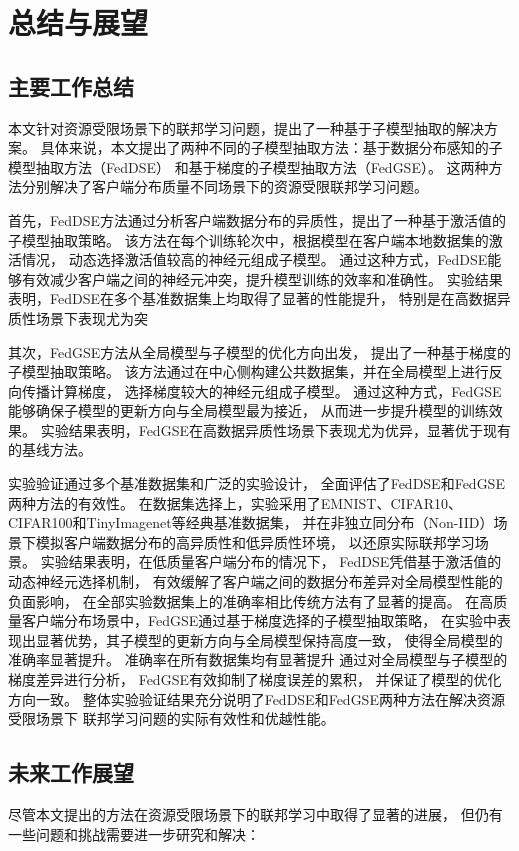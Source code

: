 \chapter{总结与展望}

\section{主要工作总结}
本文针对资源受限场景下的联邦学习问题，提出了一种基于子模型抽取的解决方案。
具体来说，本文提出了两种不同的子模型抽取方法：基于数据分布感知的子模型抽取方法（FedDSE）
和基于梯度的子模型抽取方法（FedGSE）。
这两种方法分别解决了客户端分布质量不同场景下的资源受限联邦学习问题。

首先，FedDSE方法通过分析客户端数据分布的异质性，提出了一种基于激活值的子模型抽取策略。
该方法在每个训练轮次中，根据模型在客户端本地数据集的激活情况，
动态选择激活值较高的神经元组成子模型。
通过这种方式，FedDSE能够有效减少客户端之间的神经元冲突，提升模型训练的效率和准确性。
实验结果表明，FedDSE在多个基准数据集上均取得了显著的性能提升，
特别是在高数据异质性场景下表现尤为突

其次，FedGSE方法从全局模型与子模型的优化方向出发，
提出了一种基于梯度的子模型抽取策略。
该方法通过在中心侧构建公共数据集，并在全局模型上进行反向传播计算梯度，
选择梯度较大的神经元组成子模型。
通过这种方式，FedGSE能够确保子模型的更新方向与全局模型最为接近，
从而进一步提升模型的训练效果。
实验结果表明，FedGSE在高数据异质性场景下表现尤为优异，显著优于现有的基线方法。

实验验证通过多个基准数据集和广泛的实验设计，
全面评估了FedDSE和FedGSE两种方法的有效性。
在数据集选择上，实验采用了EMNIST、CIFAR10、CIFAR100和TinyImagenet等经典基准数据集，
并在非独立同分布（Non-IID）场景下模拟客户端数据分布的高异质性和低异质性环境，
以还原实际联邦学习场景。
实验结果表明，在低质量客户端分布的情况下，
FedDSE凭借基于激活值的动态神经元选择机制，
有效缓解了客户端之间的数据分布差异对全局模型性能的负面影响，
在全部实验数据集上的准确率相比传统方法有了显著的提高。
在高质量客户端分布场景中，FedGSE通过基于梯度选择的子模型抽取策略，
在实验中表现出显著优势，其子模型的更新方向与全局模型保持高度一致，
使得全局模型的准确率显著提升。
准确率在所有数据集均有显著提升
通过对全局模型与子模型的梯度差异进行分析，
FedGSE有效抑制了梯度误差的累积，
并保证了模型的优化方向一致。
整体实验验证结果充分说明了FedDSE和FedGSE两种方法在解决资源受限场景下
联邦学习问题的实际有效性和优越性能。

\section{未来工作展望}
尽管本文提出的方法在资源受限场景下的联邦学习中取得了显著的进展，
但仍有一些问题和挑战需要进一步研究和解决：

